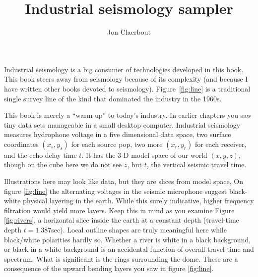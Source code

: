 \title{Industrial seismology sampler}
\author{Jon Claerbout}
\maketitle
\label{paper:rez}
Industrial seismology is a big consumer
of technologies developed in this book.
This book steers away from seismology because of its complexity
(and because I have written other books devoted to seismology).
Figure~\ref{fig:line} is a traditional single survey line
of the kind that dominated the industry in the 1960s.

\par
This book is merely a ``warm up'' to today's industry.
In earlier chapters you saw tiny data
sets manageable in a small desktop computer.
Industrial seismology measures hydrophone voltage
in a five dimensional data space,
two surface coordinates $(x_s,y_s)$ for each source pop,
two more  $(x_r,y_r)$ for each receiver,
and the echo delay time $t$.
It has the 3-D model space of our world $(x,y,z)$,
though on the cube here we do not see $z$,
but $t$, the vertical seismic travel time.
\par


\par
Illustrations here may look like data,
but they are slices from model space,
On figure \ref{fig:line} the alternating voltages in the seismic microphone
suggest black-white physical layering in the earth.
While this surely indicative,
higher frequency filtration would yield more layers.
Keep this in mind as you examine Figure \ref{fig:rivers},
a horizontal slice inside the earth at a constant depth
(travel-time depth $t=1.387$sec).
Local outline shapes are truly meaningful here while
black/white polarities hardly so.
Whether a river is white in a black background,
or black in a white background is an accidental function
of overall travel time and spectrum.
What is significant is the rings surrounding the dome.
These are a consequence of the upward bending layers
you saw in figure  \ref{fig:line}.

